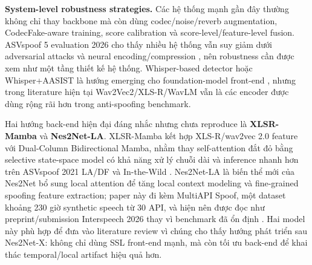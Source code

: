 \textbf{System-level robustness strategies.} Các hệ thống mạnh gần đây thường không chỉ thay backbone mà còn dùng codec/noise/reverb augmentation, CodecFake-aware training, score calibration và score-level/feature-level fusion. ASVspoof 5 evaluation 2026 cho thấy nhiều hệ thống vẫn suy giảm dưới adversarial attacks và neural encoding/compression \cite{asvspoof5_eval}, nên robustness cần được xem như một tầng thiết kế hệ thống. Whisper-based detector hoặc Whisper+AASIST là hướng emerging cho foundation-model front-end \cite{whisper_aasist}, nhưng trong literature hiện tại Wav2Vec2/XLS-R/WavLM vẫn là các encoder được dùng rộng rãi hơn trong anti-spoofing benchmark.

Hai hướng back-end hiện đại đáng nhắc nhưng chưa reproduce là \textbf{XLSR-Mamba} và \textbf{Nes2Net-LA}. XLSR-Mamba kết hợp XLS-R/wav2vec 2.0 feature với Dual-Column Bidirectional Mamba, nhằm thay self-attention đắt đỏ bằng selective state-space model có khả năng xử lý chuỗi dài và inference nhanh hơn trên ASVspoof 2021 LA/DF và In-the-Wild \cite{xlsr_mamba}. Nes2Net-LA là biến thể mới của Nes2Net bổ sung local attention để tăng local context modeling và fine-grained spoofing feature extraction; paper này đi kèm MultiAPI Spoof, một dataset khoảng 230 giờ synthetic speech từ 30 API, và hiện nên được đọc như preprint/submission Interspeech 2026 thay vì benchmark đã ổn định \cite{multiapi_spoof}. Hai model này phù hợp để đưa vào literature review vì chúng cho thấy hướng phát triển sau Nes2Net-X: không chỉ dùng SSL front-end mạnh, mà còn tối ưu back-end để khai thác temporal/local artifact hiệu quả hơn.

